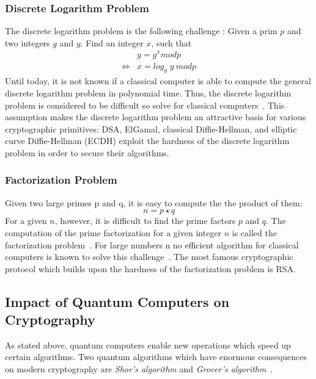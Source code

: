 \subsubsection{Discrete Logarithm Problem} \label{discrete_log_problem}
The discrete logarithm problem is the following challenge \parencite{beutelspacher2010diskrete}: Given a prim $p$ and two integers $g$ and $y$. Find an integer $x$, such that
\begin{equation*}
\begin{split}
&y = g^x mod p \\
\iff &x = log_g\;y\:mod p
\end{split}
\end{equation*}
Until today, it is not known if a classical computer is able to compute the general discrete logarithm problem in polynomial time. Thus, the discrete logarithm problem is considered to be difficult so solve for classical computers~\parencite{beutelspacher2010diskrete}. This assumption makes the discrete logarithm problem an attractive basis for various cryptographic primitives: DSA, ElGamal, classical Diffie-Hellman, and elliptic curve Diffie-Hellman (ECDH) exploit the hardness of the discrete logarithm problem in order to secure their algorithms.

\subsubsection{Factorization Problem} \label{factorization_problem}

Given two large primes p and q, it is easy to compute the the product of them:
\begin{equation*}
n = p \star q
\end{equation*}
For a given $n$, however, it is difficult to find the prime factors $p$ and $q$. The computation of the prime factorization for a given integer $n$ is called the factorization problem~\parencite{ITSicherheit}. For large numbers n no efficient algorithm for classical computers is known to solve this challenge~\parencite{ITSicherheit}. The most famous cryptographic protocol which builds upon the hardness of the factorization problem is RSA.

\subsection{Impact of Quantum Computers on Cryptography}

As stated above, quantum computers enable new operations which speed up certain algorithms. Two quantum algorithms which have enormous consequences on modern cryptography are \textit{Shor's algorithm} and \textit{Grover's algorithm}~\parencite{nielsen2002quantum}.

